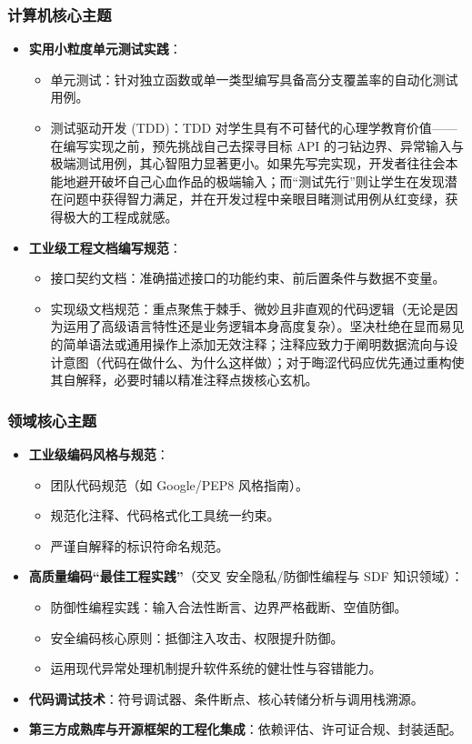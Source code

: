 \subsubsection{计算机核心主题}
\begin{itemize}
    \item \textbf{实用小粒度单元测试实践}：
    \begin{itemize}
        \item 单元测试：针对独立函数或单一类型编写具备高分支覆盖率的自动化测试用例。
        \item 测试驱动开发 (TDD)：TDD 对学生具有不可替代的心理学教育价值——在编写实现之前，预先挑战自己去探寻目标 API 的刁钻边界、异常输入与极端测试用例，其心智阻力显著更小。如果先写完实现，开发者往往会本能地避开破坏自己心血作品的极端输入；而“测试先行”则让学生在发现潜在问题中获得智力满足，并在开发过程中亲眼目睹测试用例从红变绿，获得极大的工程成就感。
    \end{itemize}
    \item \textbf{工业级工程文档编写规范}：
    \begin{itemize}
        \item 接口契约文档：准确描述接口的功能约束、前后置条件与数据不变量。
        \item 实现级文档规范：重点聚焦于棘手、微妙且非直观的代码逻辑（无论是因为运用了高级语言特性还是业务逻辑本身高度复杂）。坚决杜绝在显而易见的简单语法或通用操作上添加无效注释；注释应致力于阐明数据流向与设计意图（代码在做什么、为什么这样做）；对于晦涩代码应优先通过重构使其自解释，必要时辅以精准注释点拨核心玄机。
    \end{itemize}
\end{itemize}

\subsubsection{领域核心主题}
\begin{itemize}
    \item \textbf{工业级编码风格与规范}：
    \begin{itemize}
        \item 团队代码规范（如 Google/PEP8 风格指南）。
        \item 规范化注释、代码格式化工具统一约束。
        \item 严谨自解释的标识符命名规范。
    \end{itemize}
    \item \textbf{高质量编码“最佳工程实践”}（交叉 安全隐私/防御性编程与 SDF 知识领域）：
    \begin{itemize}
        \item 防御性编程实践：输入合法性断言、边界严格截断、空值防御。
        \item 安全编码核心原则：抵御注入攻击、权限提升防御。
        \item 运用现代异常处理机制提升软件系统的健壮性与容错能力。
    \end{itemize}
    \item \textbf{代码调试技术}：符号调试器、条件断点、核心转储分析与调用栈溯源。
    \item \textbf{第三方成熟库与开源框架的工程化集成}：依赖评估、许可证合规、封装适配。
\end{itemize}

